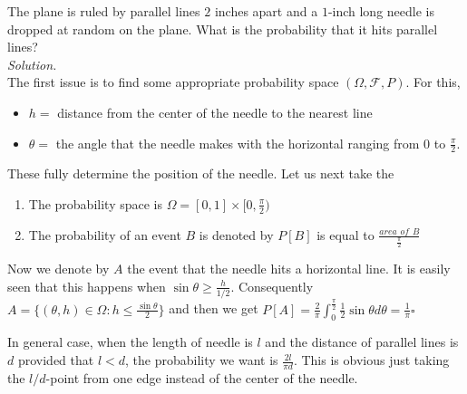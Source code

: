 \documentclass[12pt]{article}
\begin{document}
The plane is ruled by parallel lines $ 2$ inches apart and a $ 1$-inch long needle is dropped at random on the
plane. What is the probability that it hits parallel lines?
\\\textit{Solution.}
\\The first issue is to find some appropriate probability space $(\Omega, \mathcal{F}, P)$. For this,
\begin{itemize}
\item $h=$ distance from the center of the needle to the nearest line 
\item $\theta=$ the angle that the needle makes with the horizontal ranging from $0$ to $\frac{\pi}{2}$.
\end{itemize}
These fully determine the position of the needle. Let us next take the 
\begin{enumerate}
\item The probability space is $\Omega=[0,1]\times[0,\frac{\pi}{2})$
\item The probability of an event $B$ is denoted by $P[B]$ is equal to 
$\frac{area\,\ of\,\ B}{\frac{\pi}{2}}$
\end{enumerate}
Now we denote by $A$ the event that the needle hits a horizontal line. It is easily seen that this happens
when $\sin\theta\geq \frac{h}{1/2}$. Consequently $A=\{(\theta, h)\in \Omega : h\leq \frac{\sin\theta}{2}\}$
and then we get $P[A]=\frac{2}{\pi}\int_0^\frac{\pi}{2}\frac{1}{2}\sin\theta d\theta=\frac{1}{\pi}\square$

In general case, when the length of needle is $l$ and the distance of parallel lines is $d$ provided that $l<d$, the probability we want is $\frac{2l}{\pi d}$. This is obvious just taking the $l/d$-point from one edge instead of the center of the needle.




\end{document}
